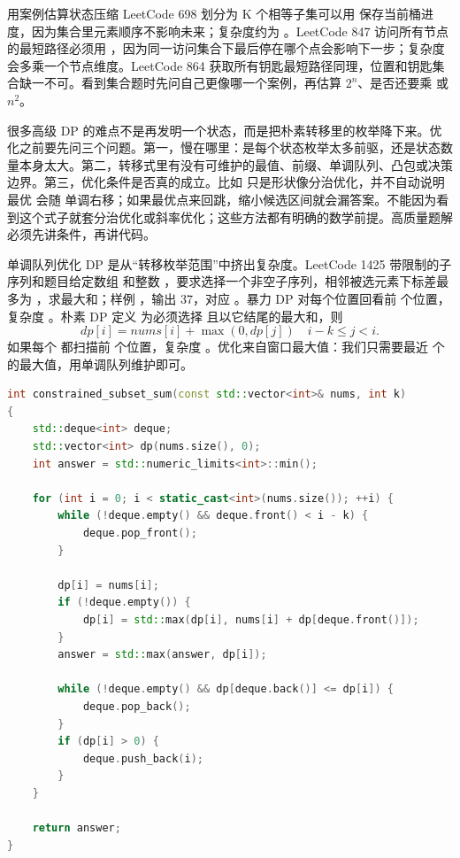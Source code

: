 \begin{principlebox}{用案例估算状态压缩}
LeetCode 698 划分为 K 个相等子集可以用  保存当前桶进度，因为集合里元素顺序不影响未来；复杂度约为 。LeetCode 847 访问所有节点的最短路径必须用 ，因为同一访问集合下最后停在哪个点会影响下一步；复杂度会多乘一个节点维度。LeetCode 864 获取所有钥匙最短路径同理，位置和钥匙集合缺一不可。看到集合题时先问自己更像哪一个案例，再估算 \ensuremath{2^n}、是否还要乘  或 \ensuremath{n^2}。
\end{principlebox}

很多高级 DP 的难点不是再发明一个状态，而是把朴素转移里的枚举降下来。优化之前要先问三个问题。第一，慢在哪里：是每个状态枚举太多前驱，还是状态数量本身太大。第二，转移式里有没有可维护的最值、前缀、单调队列、凸包或决策边界。第三，优化条件是否真的成立。比如  只是形状像分治优化，并不自动说明最优  会随  单调右移；如果最优点来回跳，缩小候选区间就会漏答案。不能因为看到这个式子就套分治优化或斜率优化；这些方法都有明确的数学前提。高质量题解必须先讲条件，再讲代码。

单调队列优化 DP 是从“转移枚举范围”中挤出复杂度。LeetCode 1425 带限制的子序列和题目给定数组  和整数 ，要求选择一个非空子序列，相邻被选元素下标差最多为 ，求最大和；样例 ，输出 37，对应 。暴力 DP 对每个位置回看前  个位置，复杂度 。朴素 DP 定义  为必须选择  且以它结尾的最大和，则
\[
dp[i] = nums[i] + \max(0, dp[j]) \quad i-k \le j < i.
\]
如果每个  都扫描前  个位置，复杂度 。优化来自窗口最大值：我们只需要最近  个  的最大值，用单调队列维护即可。

\begin{lstlisting}[language=C++,caption={LeetCode 1425 受限子序列和：单调队列优化转移最大值}]
int constrained_subset_sum(const std::vector<int>& nums, int k)
{
    std::deque<int> deque;
    std::vector<int> dp(nums.size(), 0);
    int answer = std::numeric_limits<int>::min();

    for (int i = 0; i < static_cast<int>(nums.size()); ++i) {
        while (!deque.empty() && deque.front() < i - k) {
            deque.pop_front();
        }

        dp[i] = nums[i];
        if (!deque.empty()) {
            dp[i] = std::max(dp[i], nums[i] + dp[deque.front()]);
        }
        answer = std::max(answer, dp[i]);

        while (!deque.empty() && dp[deque.back()] <= dp[i]) {
            deque.pop_back();
        }
        if (dp[i] > 0) {
            deque.push_back(i);
        }
    }

    return answer;
}
\end{lstlisting}

